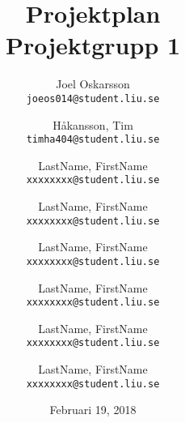 \title{Projektplan\\Projektgrupp 1}
\author{
	Joel Oskarsson\\
	\texttt{joeos014@student.liu.se}
	\and
    Håkansson, Tim\\
	\texttt{timha404@student.liu.se}
	\and
	LastName, FirstName\\
	\texttt{xxxxxxxx@student.liu.se}
	\and
	LastName, FirstName\\
	\texttt{xxxxxxxx@student.liu.se}
	\and
	LastName, FirstName\\
	\texttt{xxxxxxxx@student.liu.se}
  	\and
  	LastName, FirstName\\
	\texttt{xxxxxxxx@student.liu.se}
  	\and
  	LastName, FirstName\\
	\texttt{xxxxxxxx@student.liu.se}
  	\and
  	LastName, FirstName\\
	\texttt{xxxxxxxx@student.liu.se}
}

\date{Februari 19, 2018}

\maketitle
\pagebreak
